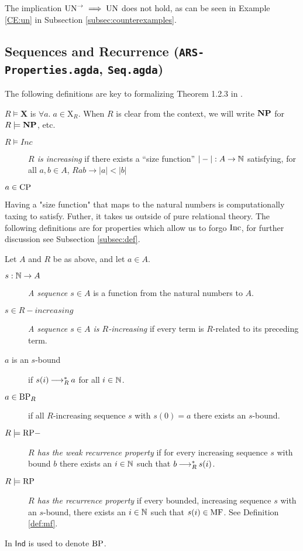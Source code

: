 The implication $\mathrm{UN}^{\to} \implies \mathrm{UN}$ does not hold, as can be seen in Example \ref{CE:un} in Subsection \ref{subsec:counterexamples}.

\subsection{Sequences and Recurrence (\texttt{ARS-Properties.agda}, \texttt{Seq.agda})}
The following definitions are key to formalizing Theorem 1.2.3 in \terese.

\begin{notation}
    $R \models \mathbf{X}$ is $\forall a.\; a \in \mathrm{X}_R$. When $R$ is clear from the context, we will write $\mathbf{NP}$ for $R \models \mathbf{NP}$, etc. 
\end{notation}

\begin{definition}
    \begin{description}
        \item[$R \models Inc$] \emph{$R$ is increasing} if there exists a ``size function'' $|-| : A \to \mathbb{N}$ satisfying, for all $a, b \in A$,
        $Rab \to |a| < |b|$  
        \item[$a \in \mathrm{CP}$] 
    \end{description}
\end{definition}

Having a "size function" that maps to the natural numbers is computationally taxing to satisfy. 
Futher, it takes us outside of pure relational theory. The following definitions are for properties which allow us to forgo $\mathrm{Inc}$, for further discussion see Subsection \ref{subsec:def}.
\begin{definition} \label{def:rp} Let $A$ and $R$ be as above, and let $a \in A$.
    \begin{description} 
        \item[$s : \mathbb{N} \to A$] \emph{A sequence $s \in A$} is a function from the natural numbers to $A$.  
        \item[$s \in R-increasing$] \emph{A sequence $s \in A$ is $R$-increasing} if every term is $R$-related to its preceding term.
        \item[$a$ is an $s$-bound] if $s (i) \mathbin{\longrightarrow_R^*} a$ for all $i \in \mathbb{N}$. 
        \item[$a \in \mathrm{BP}_R$] if all $R$-increasing sequence $s$ with $s (0) = a$ there exists an $s$-bound.  
        \item[$R \models \mathrm{RP-}$] \emph{$R$ has the weak recurrence property} if for every increasing sequence $s$ with bound $b$ there exists an $i \in \mathbb{N}$ such that $b \mathbin{\longrightarrow_R^*} s (i)$.
        \item[$R \models \mathrm{RP}$] \emph{$R$ has the recurrence property} if every bounded, increasing sequence $s$ with an $s$-bound, there exists an $i \in \mathbb{N}$ such that 
        $s (i) \in \mathrm{MF}$. See Definition \ref{def:mf}. 
    \end{description}
\end{definition}
In \terese $\mathsf{Ind}$ is used to denote $\mathrm{BP}$. 

